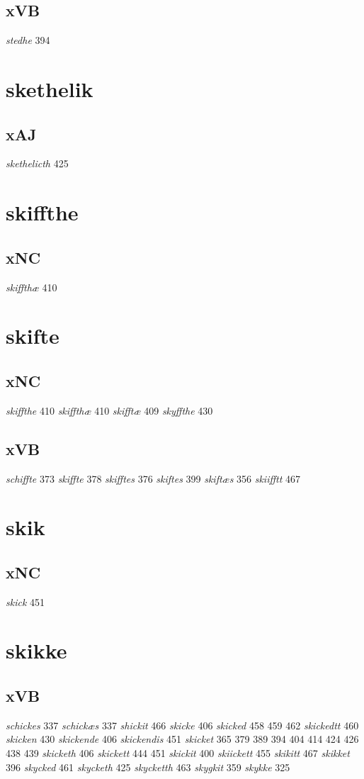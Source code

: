 \documentclass[a4paper,twocolumn]{article}
\begin{document}
\subsection{xVB}
\label{sec:orgcf720bd}
\emph{stedhe} 394 
\section{skethelik}
\label{sec:org43ac8b4}
\subsection{xAJ}
\label{sec:org80a16a7}
\emph{skethelicth} 425 
\section{skiffthe}
\label{sec:orgf133bdf}
\subsection{xNC}
\label{sec:org03bd983}
\emph{skiffthæ} 410 
\section{skifte}
\label{sec:org7355ed2}
\subsection{xNC}
\label{sec:orgb97adf9}
\emph{skiffthe} 410 \emph{skiffthæ} 410 \emph{skifftæ} 409 \emph{skyffthe} 430 
\subsection{xVB}
\label{sec:org360d137}
\emph{schiffte} 373 \emph{skiffte} 378 \emph{skifftes} 376 \emph{skiftes} 399 \emph{skiftæs} 356 \emph{skiifftt} 467 
\section{skik}
\label{sec:orgb057520}
\subsection{xNC}
\label{sec:org78355b5}
\emph{skick} 451 
\section{skikke}
\label{sec:orgf75a18e}
\subsection{xVB}
\label{sec:org7cf4c9a}
\emph{schickes} 337 \emph{schickæs} 337 \emph{shickit} 466 \emph{skicke} 406 \emph{skicked} 458 459 462 \emph{skickedtt} 460 \emph{skicken} 430 \emph{skickende} 406 \emph{skickendis} 451 \emph{skicket} 365 379 389 394 404 414 424 426 438 439 \emph{skicketh} 406 \emph{skickett} 444 451 \emph{skickit} 400 \emph{skiickett} 455 \emph{skikitt} 467 \emph{skikket} 396 \emph{skycked} 461 \emph{skycketh} 425 \emph{skycketth} 463 \emph{skygkit} 359 \emph{skykke} 325 
\end{document}
